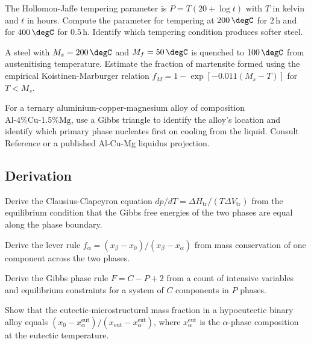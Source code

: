 \begin{exercise}
The Hollomon-Jaffe tempering parameter is $P = T(20 + \log t)$ with
$T$ in kelvin and $t$ in hours. Compute the parameter for tempering
at $200\,\degC$ for $2\,\text{h}$ and for $400\,\degC$ for $0.5\,\text{h}$.
Identify which tempering condition produces softer steel.
\end{exercise}

\begin{exercise}
A steel with $M_s = 200\,\degC$ and $M_f = 50\,\degC$ is quenched to
$100\,\degC$ from austenitising temperature. Estimate the fraction of
martensite formed using the empirical Koistinen-Marburger relation
$f_M = 1 - \exp[-0.011(M_s - T)]$ for $T < M_s$.
\end{exercise}

\begin{exercise}
For a ternary aluminium-copper-magnesium alloy of composition
$\text{Al}\text{-}4\%\text{Cu}\text{-}1.5\%\text{Mg}$, use a Gibbs
triangle to identify the alloy's location and identify which primary
phase nucleates first on cooling from the liquid. Consult Reference
\cite{text:porter-easterling-phase} or a published Al-Cu-Mg liquidus
projection.
\end{exercise}

\subsection*{Derivation}

\begin{exercise}
Derive the Clausius-Clapeyron equation $dp/dT = \Delta H_{\text{tr}}
/(T \Delta V_{\text{tr}})$ from the equilibrium condition that the
Gibbs free energies of the two phases are equal along the phase
boundary.
\end{exercise}

\begin{exercise}
Derive the lever rule $f_\alpha = (x_\beta - x_0)/(x_\beta - x_\alpha)$
from mass conservation of one component across the two phases.
\end{exercise}

\begin{exercise}
Derive the Gibbs phase rule $F = C - P + 2$ from a count of intensive
variables and equilibrium constraints for a system of $C$ components
in $P$ phases.
\end{exercise}

\begin{exercise}
Show that the eutectic-microstructural mass fraction in a hypoeutectic
binary alloy equals $(x_0 - x_\alpha^{\text{eut}})/(x_{\text{eut}} -
x_\alpha^{\text{eut}})$, where $x_\alpha^{\text{eut}}$ is the
$\alpha$-phase composition at the eutectic temperature.
\end{exercise}

